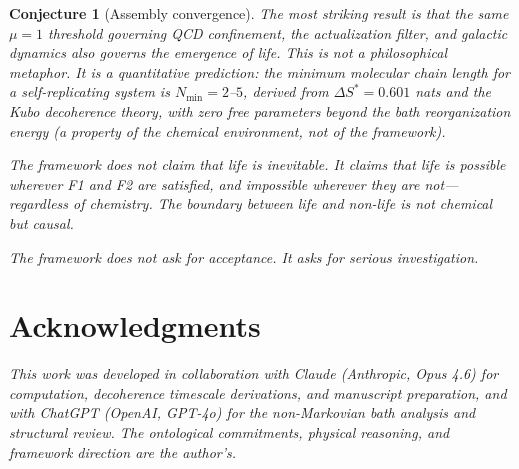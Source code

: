 \documentclass[11pt]{article}
\newtheorem{conjecture}{Conjecture}
\begin{document}
\begin{conjecture}[Assembly convergence]
The most striking result is that the same $\mu=1$ threshold governing QCD confinement, the actualization filter, and galactic dynamics also governs the emergence of life. This is not a philosophical metaphor. It is a quantitative prediction: the minimum molecular chain length for a self-replicating system is $N_{\min}=2$--$5$, derived from $\Delta S^*=0.601$ nats and the Kubo decoherence theory, with zero free parameters beyond the bath reorganization energy (a property of the chemical environment, not of the framework).

The framework does not claim that life is inevitable. It claims that life is \emph{possible} wherever F1 and F2 are satisfied, and \emph{impossible} wherever they are not---regardless of chemistry. The boundary between life and non-life is not chemical but causal.

The framework does not ask for acceptance. It asks for serious investigation.

\section*{Acknowledgments}

This work was developed in collaboration with Claude (Anthropic, Opus 4.6) for computation, decoherence timescale derivations, and manuscript preparation, and with ChatGPT (OpenAI, GPT-4o) for the non-Markovian bath analysis and structural review. The ontological commitments, physical reasoning, and framework direction are the author's.


\end{conjecture}
\end{document}
